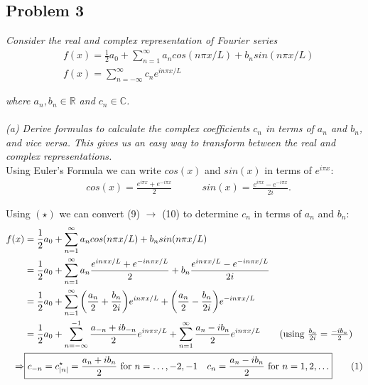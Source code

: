 \documentclass[10pt]{article}
\newcommand\numberthis{\addtocounter{equation}{1}\tag{\theequation}}
\DeclarePairedDelimiter \abs{\lvert}{\rvert}%
\theoremstyle{remark}
\begin{document}
\newpage

\subsection*{Problem 3}

\textit{Consider the real and complex representation of Fourier series}
\begin{align}
	& f(x) = \frac{1}{2}a_0 + \sum\limits_{n=1}^\infty a_n cos(n\pi x/L) + b_n sin(n\pi x/L) \\
	& f(x) = \sum\limits_{n = -\infty}^\infty c_n e^{in\pi x/L}
\end{align}

\textit{where $a_n, b_n \in \mathbb{R}$ and $c_n \in \mathbb{C}$.} \\ \\
\textit{(a) Derive formulas to calculate the complex coefficients $c_n$ in terms of $a_n$ and $b_n$, and vice versa. This gives us an easy way to transform between the real and complex representations.} \\

Using Euler's Formula we can write $cos(x)$ and $sin(x)$ in terms of $e^{i\pi x}$: 
\begin{align*}
	& cos(x) = \frac{e^{i \pi x} + e^{-i\pi x}}{2} \quad\quad\quad sin(x) = \frac{e^{i\pi x} - e^{-i\pi x}}{2i}. \tag{$\star$}
\end{align*}

Using $(\star)$ we can convert (9) $\rightarrow$ (10) to determine $c_n$ in terms of $a_n$ and $b_n$:
\begin{align*}
	f(x) & = \frac{1}{2}a_0 + \sum\limits_{n=1}^\infty a_n cos(n\pi x/L) + b_n sin(n\pi x/L) \\
	& = \frac{1}{2}a_0 + \sum\limits_{n=1}^\infty a_n\frac{e^{in\pi x/L} + e^{-in\pi x/L}}{2} + b_n\frac{e^{in\pi x/L} - e^{-in\pi x/L}}{2i} \\
	& = \frac{1}{2}a_0 + \sum\limits_{n=1}^\infty \bigg(\frac{a_n}{2} + \frac{b_n}{2i}\bigg)e^{in\pi x/L} + \bigg(
	\frac{a_n}{2} - \frac{b_n}{2i}\bigg)e^{-in\pi x/L} \\
	& = \frac{1}{2}a_0 + \sum\limits_{n=-\infty}^{-1}\frac{a_{-n} + ib_{-n}}{2}e^{in\pi x/L} + \sum\limits_{n=1}^\infty \frac{a_n - ib_n}{2}e^{in\pi x/L} \tag{using $\frac{b_n}{2i} = \frac{-ib_n}{2}$} \\
	\Rightarrow & \boxed{c_{-n} = c_{\abs{n}}^\star = \frac{a_{n} + ib_{n}}{2} \text{ for } n = \ldots,-2,-1 \quad c_n = \frac{a_n - ib_n}{2} \text{ for } n = 1,2,\ldots} \numberthis
\end{align*}
\end{document}
